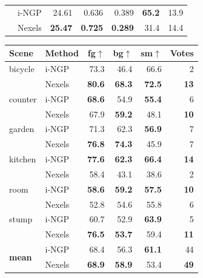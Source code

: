 \begin{table}[t]
\begin{minipage}[t]{0.48\textwidth}
\begin{tabular}{llrrrrr}
        & i-NGP  & 24.61          & 0.636          & 0.389          & \textbf{65.2} & 13.9          \\
        & Nexels & \textbf{25.47} & \textbf{0.725} & \textbf{0.289} & 31.4          & 14.4          \\
\bottomrule
\end{tabular}
\end{minipage}
\hfill
\begin{minipage}[t]{0.48\textwidth}
\centering\footnotesize
{}
\label{tab:cross_human}
\setlength{\tabcolsep}{4pt}
\begin{tabular}{llrrrr}
\toprule
Scene & Method & fg$\uparrow$ & bg$\uparrow$ & sm$\uparrow$ & Votes \\
\midrule
bicycle & i-NGP  & 73.3          & 46.4          & 66.6          & 2              \\
        & Nexels & \textbf{80.6} & \textbf{68.3} & \textbf{72.5} & \textbf{13}    \\
counter & i-NGP  & \textbf{68.6} & 54.9          & \textbf{55.4} & 6              \\
        & Nexels & 67.9          & \textbf{59.2} & 48.1          & \textbf{10}    \\
garden  & i-NGP  & 71.3          & 62.3          & \textbf{56.9} & 7              \\
        & Nexels & \textbf{76.8} & \textbf{74.3} & 45.9          & 7              \\
kitchen & i-NGP  & \textbf{77.6} & \textbf{62.3} & \textbf{66.4} & \textbf{14}    \\
        & Nexels & 58.4          & 43.1          & 38.6          & 2              \\
room    & i-NGP  & \textbf{58.6} & \textbf{59.2} & \textbf{57.5} & \textbf{10}    \\
        & Nexels & 52.8          & 54.6          & 55.8          & 6              \\
stump   & i-NGP  & 60.7          & 52.9          & \textbf{63.9} & 5              \\
        & Nexels & \textbf{76.5} & \textbf{53.7} & 59.4          & \textbf{11}    \\
\midrule
\multirow{2}{*}{\textbf{mean}}
        & i-NGP  & 68.4          & 56.3          & \textbf{61.1} & 44             \\
        & Nexels & \textbf{68.9} & \textbf{58.9} & 53.4          & \textbf{49}    \\
\bottomrule
\end{tabular}
\end{minipage}
\end{table}

